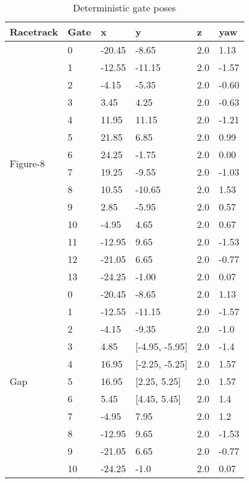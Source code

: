 \begin{table}[h]
    \footnotesize
    \caption{Deterministic gate poses\label{tab:gate_pos}}
    \centering
    \begin{tabular}{|l|l|l|l|l|l|}
    \hline
    Racetrack & Gate & x & y & z & yaw\\ 
    \hline
    \hline
    \multirow{14}{*}{Figure-8}   
    &0 &-20.45& -8.65&2.0& 1.13\\ \cline{2-6}
    &1 &-12.55&-11.15&2.0&-1.57\\ \cline{2-6}
    &2 &-4.15 & -5.35&2.0&-0.60\\ \cline{2-6}
    &3 &3.45  &  4.25&2.0&-0.63\\ \cline{2-6}
    &4 &11.95 & 11.15&2.0&-1.21\\ \cline{2-6}
    &5 &21.85 &  6.85&2.0& 0.99\\ \cline{2-6}
    &6 &24.25 & -1.75&2.0& 0.00\\ \cline{2-6}
    &7 &19.25 & -9.55&2.0&-1.03\\ \cline{2-6}
    &8 &10.55 &-10.65&2.0& 1.53\\ \cline{2-6}
    &9 &2.85  & -5.95&2.0& 0.57\\ \cline{2-6}
    &10&-4.95 &  4.65&2.0& 0.67\\ \cline{2-6}
    &11&-12.95&  9.65&2.0&-1.53\\ \cline{2-6}
    &12&-21.05&  6.65&2.0&-0.77\\ \cline{2-6}
    &13&-24.25& -1.00&2.0& 0.07\\
    \hline
    \hline
    \multirow{14}{*}{Gap}   
    &0 &-20.45&-8.65         &2.0& 1.13\\ \cline{2-6}
    &1 &-12.55&-11.15        &2.0&-1.57\\ \cline{2-6}
    &2 &-4.15 &-9.35         &2.0& -1.0\\ \cline{2-6}
    &3 &4.85  &[-4.95, -5.95]&2.0& -1.4\\ \cline{2-6}
    &4 &16.95 &[-2.25, -5.25]&2.0& 1.57\\ \cline{2-6}
    &5 &16.95 &[2.25,   5.25]&2.0& 1.57\\ \cline{2-6}
    &6 &5.45  &[4.45,   5.45]&2.0&  1.4\\ \cline{2-6}
    &7 &-4.95 &7.95          &2.0&  1.2\\ \cline{2-6}
    &8 &-12.95&9.65          &2.0&-1.53\\ \cline{2-6}
    &9 &-21.05&6.65          &2.0&-0.77\\ \cline{2-6}
    &10&-24.25&-1.0          &2.0& 0.07\\
    \hline
    \end{tabular}
\end{table}






